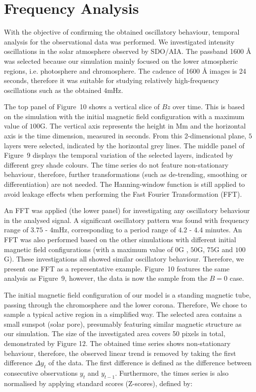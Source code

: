 \documentclass[physics,article,submit,pdftex,moreauthors]{Definitions/mdpi}
\begin{document}
\section{Frequency Analysis}




With the objective of confirming  the obtained oscillatory behaviour, temporal analysis for the observational data was performed. We investigated intensity oscillations in the solar atmosphere observed by SDO/AIA. The passband 1600 {\AA} was selected because our simulation mainly focused on the lower atmospheric regions, i.e. photosphere and chromosphere. The cadence of 1600 {\AA} images is 24 seconds, therefore it was suitable for studying relatively high-frequency oscillations such as the obtained $4$mHz.

The top panel of Figure~10 shows a vertical slice of $Bz$ over time. This is based on the simulation with the initial magnetic field configuration with a maximum value of $100$G. The vertical axis represents the height in Mm and the horizontal axis is the time dimension, measured in seconds. From this 2-dimensional plane, $5$ layers were selected, indicated by the horizontal grey lines. The middle panel of Figure~9 displays the temporal variation of the selected layers, indicated by different grey shade colours. The time series do not feature non-stationary behaviour, therefore, further transformations (such as de-trending, smoothing or differentiation) are not needed. The Hanning-window function is still applied to avoid leakage effects when performing the Fast Fourier Transformation (FFT).  



An FFT was applied (the lower panel) for investigating any oscillatory behaviour in the analysed signal. A significant oscillatory pattern was found with frequency range of $3.75$ - $4$mHz, corresponding to a period range of $4.2$ - $4.4$ minutes. An FFT was also performed based on the other simulations with different initial magnetic field configurations (with a maximum value of $0$G , $50$G,  $75$G  and $100$G). These investigations all showed similar oscillatory behaviour. Therefore, we present one FFT as a representative example. Figure~10 features the same analysis as Figure~9, however, the data is now the sample from the $B=0$ case.


The initial magnetic field configuration of our model is a standing magnetic tube, passing through the chromosphere and the lower corona. Therefore, We chose to sample a typical active region in a simplified way. The selected area contains a small sunspot (solar pore), presumably featuring similar magnetic structure as our simulation.  The size of the investigated area covers 50 pixels in total, demonstrated by Figure 12. The obtained time series shows non-stationary behaviour, therefore, the observed linear trend is removed by taking the first difference $\Delta  y_{t}$ of the data. The first difference is defined as the difference between consecutive observations $y_{t}$ and $y_{t-1}$. Furthermore, the times series is also normalised by applying standard scores (Z-scores), defined by:
\end{document}
